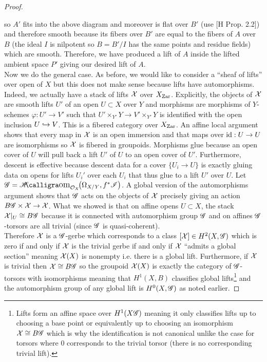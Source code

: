 \documentclass[12pt]{article}
\begin{document}
\begin{proof}
\begin{center}
\end{center}
so $A'$ fits into the above diagram and moreover is flat over $B'$ (use [H Prop. 2.2]) and therefore smooth because its fibers over $B'$ are equal to the fibers of $A$ over $B$ (the ideal $I$ is nilpotent so $B = B'/I$ has the same points and residue fields) which are smooth. Therefore, we have produced a lift of $A$ inside the lifted ambient space $P'$ giving our desired lift of $A$. 
\bigskip\\
Now we do the general case. As before, we would like to consider a ``sheaf of lifts'' over open of $X$ but this does not make sense because lifts have automorphisms. Indeed, we actually have a stack of lifts $\mathcal{X}$ over $X_{\mathrm{Zar}}$. Explicitly, the objects of $\mathcal{X}$ are smooth lifts $U'$ of an open $U \subset X$ over $Y$ and morphisms are morphisms of $Y$-schemes $\varphi : U' \to V'$ such that $U' \times_{Y'} Y \to V' \times_{Y'} Y$ is identified with the open inclusion $U \hookrightarrow V$. This is a fibered category over $X_{\mathrm{Zar}}$. An affine local argument shows that every map in $\mathcal{X}$ is an open immersion and that maps over $\mathrm{id} : U \to U$ are isomorphisms so $\mathcal{X}$ is fibered in groupoids. Morphisms glue because an open cover of $U$ will pull back a lift $U'$ of $U$ to an open cover of $U'$. Furthermore, descent is effective because descent data for a cover $\{ U_i \to U \}$ is exactly gluing data on opens for lifts $U_i'$ over each $U_i$ that thus glue to a lift $U'$ over $U$. Let $\G = \shHom{\struct{X}}{\Omega_{X/Y}}{f^* \I}$. A global version of the automorphisms argument shows that $\mathscr{G}$ acts on the objects of $\mathcal{X}$ precisely giving an action $B \mathscr{G} \times \mathcal{X} \to \mathcal{X}$. What we showed is that on affine opens $U \subset X$, the stack $\mathcal{X}|_U \cong B \mathscr{G}$ because it is connected with automorphism group $\mathscr{G}$ and on affines $\mathscr{G}$-torsors are all trivial (since $\mathscr{G}$ is quasi-coherent).
\bigskip\\
Therefore $\mathcal{X}$ is a $\mathscr{G}$-gerbe which corresponds to a class $[\mathcal{X}] \in H^2(X, \mathscr{G})$ which is zero if and only if $\mathcal{X}$ is the trivial gerbe if and only if $\mathcal{X}$ ``admits a global section'' meaning $\mathcal{X}(X)$ is nonempty i.e. there is a global lift. Furthermore, if $\mathcal{X}$ is trivial then $\mathcal{X} \cong B \mathscr{G}$ so the groupoid $\mathcal{X}(X)$ is exactly the category of $\mathscr{G}$-torsors with isomorphisms meaning that $H^1(X, B)$ classifies global lifts\footnote{Lifts form an affine space over $H^1(X \mathscr{G})$ meaning it only classifies lifts up to choosing a base point or equivalently up to choosing an isomorphism $\mathcal{X} \cong B \mathscr{G}$ which is why the identification is not canonical unlike the case for torsors where $0$ corresponds to the trivial torsor (there is no corresponding trivial lift).} and the automorphism group of any global lift is $H^0(X, \mathscr{G})$ as noted earlier.

\end{proof}
\end{document}
